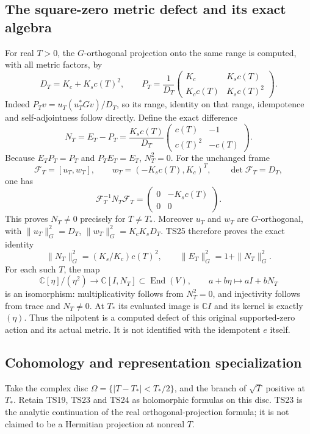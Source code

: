 \subsection{The square-zero metric defect and its exact algebra}
For real \(T>0\), the \(G\)-orthogonal projection onto the same
range is computed, with all metric factors, by
\[
 D_T=K_c+K_sc(T)^2,\qquad
 P_T=\frac1{D_T}
 \begin{pmatrix}K_c&K_sc(T)\\K_cc(T)&K_sc(T)^2\end{pmatrix}.
 \tag{TS23}
\]
Indeed \(P_Tv=u_T(u_T^*Gv)/D_T\), so its range, identity on
that range, idempotence and self-adjointness follow directly.
Define the exact difference
\[
 N_T=E_T-P_T=\frac{K_sc(T)}{D_T}
 \begin{pmatrix}c(T)&-1\\c(T)^2&-c(T)\end{pmatrix}.
 \tag{TS24}
\]
Because \(E_TP_T=P_T\) and \(P_TE_T=E_T\),
\(N_T^2=0\). For the unchanged frame
\[
 \mathcal F_T=[u_T,w_T],\qquad
 w_T=(-K_sc(T),K_c)^T,\qquad\det\mathcal F_T=D_T,
\]
one has
\[
 \mathcal F_T^{-1}N_T\mathcal F_T
   =\begin{pmatrix}0&-K_sc(T)\\0&0\end{pmatrix}.
 \tag{TS25}
\]
This proves \(N_T\ne0\) precisely for \(T\ne T_*\).
Moreover \(u_T\) and \(w_T\) are \(G\)-orthogonal, with
\(\|u_T\|_G^2=D_T\), \(\|w_T\|_G^2=K_cK_sD_T\).
TS25 therefore proves the exact identity
\[
 \|N_T\|_G^2=(K_s/K_c)c(T)^2,\qquad
 \|E_T\|_G^2=1+\|N_T\|_G^2.\tag{TS25a}
\]
For each such \(T\), the map
\[
 \mathbb C[\eta]/(\eta^2)\longrightarrow
       \mathbb C[I,N_T]\subset\operatorname{End}(V),
 \qquad a+b\eta\longmapsto aI+bN_T\tag{TS26}
\]
is an isomorphism: multiplicativity follows from \(N_T^2=0\),
and injectivity follows from trace and \(N_T\ne0\).
At \(T_*\) its evaluated image is \(\mathbb C I\) and its
kernel is exactly \((\eta)\). Thus the nilpotent is a computed
defect of this original supported-zero action and its actual metric.
It is not identified with the idempotent \(e\) itself.

\subsection{Cohomology and representation specialization}
Take the complex disc \(\Omega=\{|T-T_*|<T_*/2\}\), and
the branch of \(\sqrt T\) positive at \(T_*\). Retain TS19,
TS23 and TS24 as holomorphic formulas on this disc. TS23 is the
analytic continuation of the real orthogonal-projection formula;
it is not claimed to be a Hermitian projection at nonreal \(T\).

